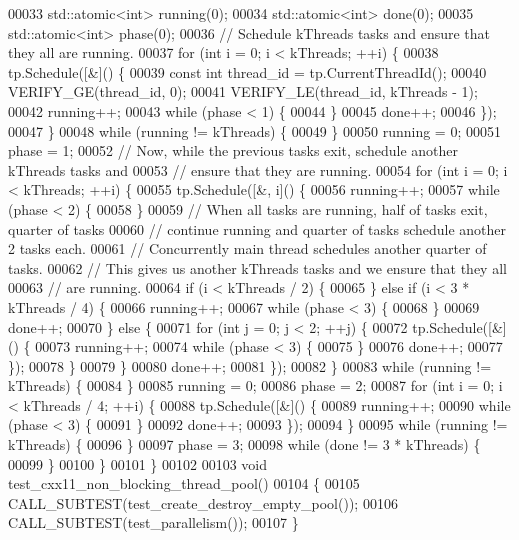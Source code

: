 \begin{DoxyCode}
00033     std::atomic<int> running(0);
00034     std::atomic<int> done(0);
00035     std::atomic<int> phase(0);
00036     \textcolor{comment}{// Schedule kThreads tasks and ensure that they all are running.}
00037     \textcolor{keywordflow}{for} (\textcolor{keywordtype}{int} i = 0; i < kThreads; ++i) \{
00038       tp.Schedule([&]() \{
00039         \textcolor{keyword}{const} \textcolor{keywordtype}{int} thread\_id = tp.CurrentThreadId();
00040         VERIFY\_GE(thread\_id, 0);
00041         VERIFY\_LE(thread\_id, kThreads - 1);
00042         running++;
00043         \textcolor{keywordflow}{while} (phase < 1) \{
00044         \}
00045         done++;
00046       \});
00047     \}
00048     \textcolor{keywordflow}{while} (running != kThreads) \{
00049     \}
00050     running = 0;
00051     phase = 1;
00052     \textcolor{comment}{// Now, while the previous tasks exit, schedule another kThreads tasks and}
00053     \textcolor{comment}{// ensure that they are running.}
00054     \textcolor{keywordflow}{for} (\textcolor{keywordtype}{int} i = 0; i < kThreads; ++i) \{
00055       tp.Schedule([&, i]() \{
00056         running++;
00057         \textcolor{keywordflow}{while} (phase < 2) \{
00058         \}
00059         \textcolor{comment}{// When all tasks are running, half of tasks exit, quarter of tasks}
00060         \textcolor{comment}{// continue running and quarter of tasks schedule another 2 tasks each.}
00061         \textcolor{comment}{// Concurrently main thread schedules another quarter of tasks.}
00062         \textcolor{comment}{// This gives us another kThreads tasks and we ensure that they all}
00063         \textcolor{comment}{// are running.}
00064         \textcolor{keywordflow}{if} (i < kThreads / 2) \{
00065         \} \textcolor{keywordflow}{else} \textcolor{keywordflow}{if} (i < 3 * kThreads / 4) \{
00066           running++;
00067           \textcolor{keywordflow}{while} (phase < 3) \{
00068           \}
00069           done++;
00070         \} \textcolor{keywordflow}{else} \{
00071           \textcolor{keywordflow}{for} (\textcolor{keywordtype}{int} j = 0; j < 2; ++j) \{
00072             tp.Schedule([&]() \{
00073               running++;
00074               \textcolor{keywordflow}{while} (phase < 3) \{
00075               \}
00076               done++;
00077             \});
00078           \}
00079         \}
00080         done++;
00081       \});
00082     \}
00083     \textcolor{keywordflow}{while} (running != kThreads) \{
00084     \}
00085     running = 0;
00086     phase = 2;
00087     \textcolor{keywordflow}{for} (\textcolor{keywordtype}{int} i = 0; i < kThreads / 4; ++i) \{
00088       tp.Schedule([&]() \{
00089         running++;
00090         \textcolor{keywordflow}{while} (phase < 3) \{
00091         \}
00092         done++;
00093       \});
00094     \}
00095     \textcolor{keywordflow}{while} (running != kThreads) \{
00096     \}
00097     phase = 3;
00098     \textcolor{keywordflow}{while} (done != 3 * kThreads) \{
00099     \}
00100   \}
00101 \}
00102 
00103 \textcolor{keywordtype}{void} test\_cxx11\_non\_blocking\_thread\_pool()
00104 \{
00105   CALL\_SUBTEST(test\_create\_destroy\_empty\_pool());
00106   CALL\_SUBTEST(test\_parallelism());
00107 \}
\end{DoxyCode}
